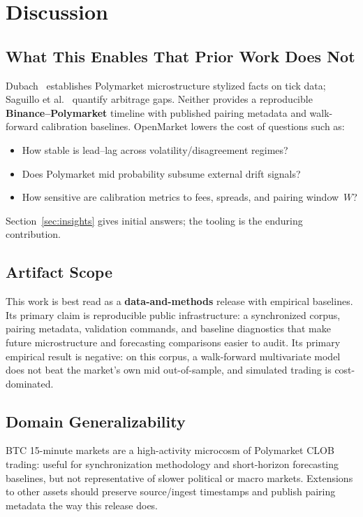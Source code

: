 \section{Discussion}
\label{sec:discussion}

\subsection{What This Enables That Prior Work Does Not}

Dubach~\cite{dubach2026anatomy} establishes Polymarket microstructure stylized
facts on tick data; Saguillo et al.~\cite{saguillo2025arbitrage} quantify
arbitrage gaps. Neither provides a reproducible \textbf{Binance--Polymarket}
timeline with published pairing metadata and walk-forward calibration baselines.
OpenMarket lowers the cost of questions such as:
\begin{itemize}
  \item How stable is lead--lag across volatility/disagreement regimes?
  \item Does Polymarket mid probability subsume external drift signals?
  \item How sensitive are calibration metrics to fees, spreads, and pairing
        window~$W$?
\end{itemize}
Section~\ref{sec:insights} gives initial answers; the tooling is the enduring
contribution.

\subsection{Artifact Scope}

This work is best read as a \textbf{data-and-methods} release with empirical
baselines. Its primary claim is reproducible public infrastructure: a
synchronized corpus, pairing metadata, validation commands, and baseline
diagnostics that make future microstructure and forecasting comparisons easier
to audit. Its primary empirical result is negative: on this corpus, a
walk-forward multivariate model does not beat the market's own mid
out-of-sample, and simulated trading is cost-dominated.

\subsection{Domain Generalizability}

BTC 15-minute markets are a high-activity microcosm of Polymarket CLOB trading:
useful for synchronization methodology and short-horizon forecasting baselines,
but not representative of slower political or macro markets. Extensions to other
assets should preserve source/ingest timestamps and publish pairing metadata the
way this release does.

